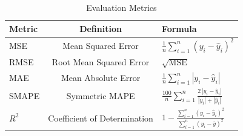 \begin{table}[h!]
\centering
\begin{tabular}{@{}lcl@{}}
\toprule
\textbf{Metric} & \textbf{Definition} & \textbf{Formula} \\
\midrule
MSE & Mean Squared Error & $\frac{1}{n}\sum_{i=1}^{n}(y_i - \hat{y}_i)^2$ \\[0.4em]
RMSE & Root Mean Squared Error & $\sqrt{\text{MSE}}$ \\[0.4em]
MAE & Mean Absolute Error & $\frac{1}{n}\sum_{i=1}^{n}|y_i - \hat{y}_i|$ \\[0.4em]
SMAPE & Symmetric MAPE & $\frac{100}{n}\sum_{i=1}^{n}\frac{2\,|y_i - \hat{y}_i|}{|y_i| + |\hat{y}_i|}$ \\[0.4em]
$R^2$ & Coefficient of Determination & $1 - \frac{\sum_{i=1}^{n}(y_i - \hat{y}_i)^2}{\sum_{i=1}^{n}(y_i - \bar{y})^2}$ \\
\bottomrule
\end{tabular}
\caption{Evaluation Metrics}
\label{tab:error_metrics}
\end{table}
